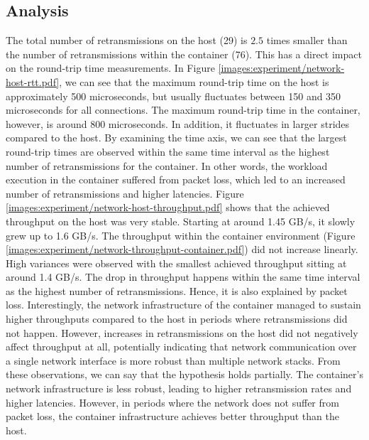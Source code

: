 \subsection{Analysis}
The total number of retransmissions on the host (29) is $2.5$ times smaller than 
the number of retransmissions within the container (76). This has a direct impact on 
the round-trip time measurements. In Figure  \ref{images:experiment/network-host-rtt.pdf}, we 
can see that the maximum round-trip time on the host is approximately 500 microseconds, but usually 
fluctuates between 150 and 350 microseconds for all connections. The maximum round-trip time 
in the container, however, is around 800 microseconds. In addition, 
it fluctuates in larger strides compared to the host. By examining the time axis, we can see 
that the largest round-trip times are observed within the same time interval as the 
highest number of retransmissions for the container. In other words, the workload execution 
in the container suffered from packet loss, which led to an increased number of retransmissions
and higher latencies. Figure \ref{images:experiment/network-host-throughput.pdf} shows 
that the achieved throughput on the host was very stable. Starting at around 1.45 GB/s, 
it slowly grew up to 1.6 GB/s. The throughput within the container environment (Figure \ref{images:experiment/network-throughput-container.pdf})
did not increase linearly. High variances were observed with the smallest achieved throughput 
sitting at around 1.4 GB/s. The drop in throughput happens within the same time interval 
as the highest number of retransmissions. Hence, it is also explained by packet loss.
Interestingly, the network infrastructure of the container managed to sustain higher 
throughputs compared to the host in periods where retransmissions did not happen.
However, increases in retransmissions on the host did not negatively affect throughput at all,
potentially indicating that network communication over a single network interface is more robust 
than multiple network stacks. From these observations, we can say that the hypothesis holds partially. 
The container's network infrastructure is less robust, leading to higher retransmission rates 
and higher latencies. However, in periods where the network does not suffer from packet loss, 
the container infrastructure achieves better throughput than the host. 